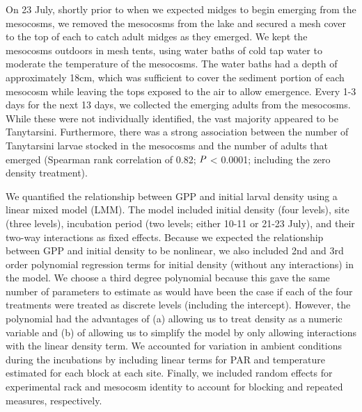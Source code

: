 On 23 July, shortly prior to when we expected midges to begin emerging from the mesocosms,
we removed the mesocosms from the lake and secured a mesh cover to the top of each
to catch adult midges as they emerged. 
We kept the mesocosms outdoors in mesh tents,
using water baths of cold tap water to moderate the temperature of the mesocosms.
The water baths had a depth of approximately 18cm,
which was sufficient to cover the sediment portion of each mesocosm while leaving the
tops exposed to the air to allow emergence.
Every 1-3 days for the next 13 days, we collected the emerging adults from the mesocosms.
While these were not individually identified, the vast majority appeared to be Tanytarsini.
Furthermore, there was a strong association between the number of Tanytarsini larvae 
stocked in the mesocosms and the number of adults that emerged 
(Spearman rank correlation of 0.82; $\emph{P}$ < 0.0001; including the zero density treatment).

We quantified the relationship between GPP and initial larval density using a 
linear mixed model (LMM). 
The model included initial density (four levels), site (three levels),
incubation period (two levels; either 10-11 or 21-23 July), 
and their two-way interactions as fixed effects.
Because we expected the relationship between GPP and initial density to be nonlinear,
we also included 2nd and 3rd order polynomial regression terms for initial density 
(without any interactions) in the model.
We choose a third degree polynomial because this gave the same number of parameters 
to estimate as would have been the case if each of the four treatments were treated as discrete
levels (including the intercept). 
However, the polynomial had the advantages of 
(a) allowing us to treat density as a numeric
variable and 
(b) of allowing us to simplify the model by only allowing interactions with the linear
density term.
We accounted for variation in ambient conditions during the incubations by including
linear terms for PAR and temperature estimated for each block at each site.
Finally, we included random effects for experimental rack and mesocosm identity to account
for blocking and repeated measures, respectively.

